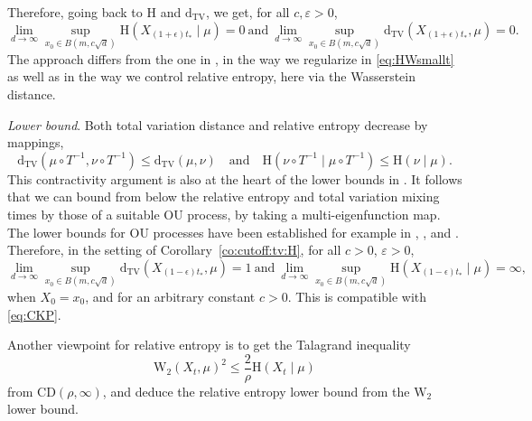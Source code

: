 \documentclass[10pt,reqno]{amsart}
\numberwithin{equation}{section}
\newcommand{\DTV}{\mathrm{d}_{\mathrm{TV}}}
\begin{document}
Therefore, going back to $\mathrm{H}$ and $\DTV$, we get, for all $c,\varepsilon>0$,
\begin{equation}
  \lim_{d\to\infty}\sup_{x_0\in B(m,c\sqrt{d})}\mathrm{H}(X_{(1+\epsilon)t_*}\mid\mu)=0 
  \ \text{and}\ %
  \lim_{d\to\infty}\sup_{x_0\in B(m,c\sqrt{d})}\DTV(X_{(1+\epsilon)t_*},\mu)=0.
\end{equation}
The approach differs from the one in \cite{BCL23}, in the way we regularize in
\eqref{eq:HWsmallt} as well as in the way we control relative entropy, here
via the Wasserstein distance.

\emph{Lower bound}. Both total variation distance and relative entropy
decrease by mappings,
\begin{equation}
  \DTV(\mu \circ T^{-1}, \nu \circ T^{-1}) \leq \DTV(\mu,\nu)
  \quad\text{and}\quad
  \mathrm{H}(\nu \circ T^{-1}\mid \mu\circ T^{-1}) \leq \mathrm{H}(\nu\mid\mu).
\end{equation}
This contractivity argument is also at the heart of the lower bounds in
\cite{BCL23}. It follows that we can bound from below the relative entropy and
total variation mixing times by those of a suitable OU process, by taking a
multi-eigenfunction map. The lower bounds for OU processes have been
established for example in \cite{MR2203823}, \cite{MR2260742}, and
\cite[Th.~1.2]{BCL23}. Therefore, in the setting of
Corollary~\ref{co:cutoff:tv:H}, for all $c>0$, $\varepsilon>0$,
\begin{equation}
  \lim_{d\to\infty}\sup_{x_0\in B(m, c\sqrt{d})} \DTV(X_{(1-\epsilon)t_*},\mu)=1
  \ \text{and}\ \lim_{d\to\infty}\sup_{x_0\in B(m, c\sqrt{d})} \mathrm{H}(X_{(1-\epsilon)t_*}\mid\mu)=\infty,
\end{equation}
when $X_0=x_0$, and for an arbitrary constant $c>0$. This is compatible with
\eqref{eq:CKP}. 

Another viewpoint for relative entropy is to get the Talagrand inequality 
\begin{equation}
  \mathrm{W}_2(X_t, \mu)^2 \leq \frac{2}{\rho}\mathrm{H}(X_t\mid\mu)
\end{equation}
from CD$(\rho, \infty)$, and deduce the relative entropy lower bound from the $\mathrm{W}_2$ lower bound. 
\end{document}
